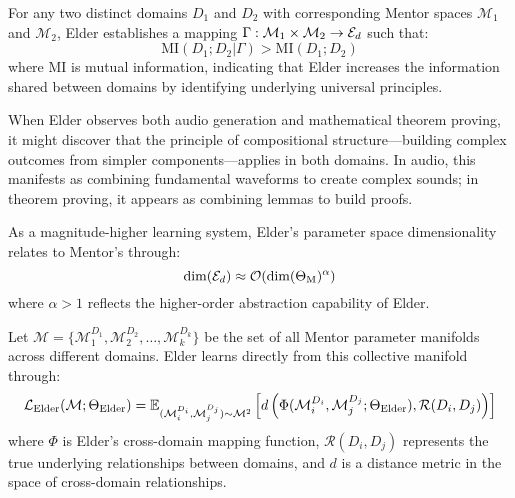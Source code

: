 \begin{theorem}
For any two distinct domains $D_1$ and $D_2$ with corresponding Mentor spaces $\mathcal{M}_1$ and $\mathcal{M}_2$, Elder establishes a mapping $\Gamma: \mathcal{M}_1 \times \mathcal{M}_2 \rightarrow \mathcal{E}_{d}$ such that:
\begin{equation}
\text{MI}(D_1; D_2 | \Gamma) > \text{MI}(D_1; D_2)
\end{equation}
where $\text{MI}$ is mutual information, indicating that Elder increases the information shared between domains by identifying underlying universal principles.
\end{theorem}

\begin{example}
When Elder observes both audio generation and mathematical theorem proving, it might discover that the principle of compositional structure—building complex outcomes from simpler components—applies in both domains. In audio, this manifests as combining fundamental waveforms to create complex sounds; in theorem proving, it appears as combining lemmas to build proofs.
\end{example}

\begin{proposition}
As a magnitude-higher learning system, Elder's parameter space dimensionality relates to Mentor's through:
\begin{equation}
\dim(\mathcal{E}_{d}) \approx \mathcal{O}(\dim(\Theta_{\text{M}})^{\alpha})
\end{equation}
where $\alpha > 1$ reflects the higher-order abstraction capability of Elder.
\end{proposition}

\begin{definition}
Let $\mathcal{M} = \{\mathcal{M}_1^{D_1}, \mathcal{M}_2^{D_2}, \ldots, \mathcal{M}_k^{D_k}\}$ be the set of all Mentor parameter manifolds across different domains. Elder learns directly from this collective manifold through:
\begin{equation}
\mathcal{L}_{\text{Elder}}(\mathcal{M}; \Theta_{\text{Elder}}) = \mathbb{E}_{(\mathcal{M}_i^{D_i}, \mathcal{M}_j^{D_j}) \sim \mathcal{M}^2} \left[ d\left(\Phi(\mathcal{M}_i^{D_i}, \mathcal{M}_j^{D_j}; \Theta_{\text{Elder}}), \mathcal{R}(D_i, D_j)\right) \right]
\end{equation}
where $\Phi$ is Elder's cross-domain mapping function, $\mathcal{R}(D_i, D_j)$ represents the true underlying relationships between domains, and $d$ is a distance metric in the space of cross-domain relationships.
\end{definition}

